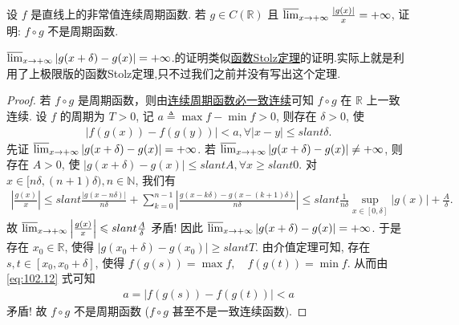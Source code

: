 \documentclass[../../main.tex]{subfiles}
\begin{document}
\begin{example}
设 $f$ 是直线上的非常值连续周期函数. 若 $g \in C(\mathbb{R})$ 且 $\varlimsup_{x \to +\infty} \frac{|g(x)|}{x} = +\infty$, 证明: $f \circ g$ 不是周期函数.
\end{example}
\begin{note}
$\varlimsup_{x \to +\infty} |g(x + \delta) - g(x)| = +\infty$.的证明类似\hyperref[theorem:函数Stolz定理]{函数Stolz定理}的证明.实际上就是利用了上极限版的函数Stolz定理,只不过我们之前并没有写出这个定理.
\end{note}
\begin{proof}
若 $f \circ g$ 是周期函数，则由\hyperref[proposition:连续周期函数必一致连续]{连续周期函数必一致连续}可知 $f \circ g$ 在 $\mathbb{R}$ 上一致连续.
设 $f$ 的周期为 $T > 0$, 记 $a \triangleq \max f - \min f > 0$, 则存在 $\delta > 0$, 使
\begin{align}
|f(g(x)) - f(g(y))| < a, \forall |x - y| \leqslant slant \delta. \label{eq:102.12}
\end{align}
先证 $\varlimsup_{x \to +\infty} |g(x + \delta) - g(x)| = +\infty$. 若 $\varlimsup_{x \to +\infty} |g(x + \delta) - g(x)| \ne +\infty$, 则存在 $A > 0$, 使
$|g(x + \delta) - g(x)| \leqslant slant A, \forall x \geqslant slant 0.$
对 $x \in [n\delta, (n + 1)\delta), n \in \mathbb{N}$, 我们有
\begin{align*}
\left| \frac{g(x)}{x} \right| \leqslant slant \frac{|g(x - n\delta)|}{n\delta} + \sum_{k=0}^{n - 1} \left| \frac{g(x - k\delta) - g(x - (k + 1)\delta)}{n\delta} \right| \leqslant slant \frac{1}{n\delta} \sup_{x \in [0, \delta]} |g(x)| + \frac{A}{\delta}.
\end{align*}
故 $\varlimsup_{x \to +\infty} \left| \frac{g(x)}{x} \right| \leqslant slant \frac{A}{\delta}$ 矛盾! 因此 $\varlimsup_{x \to +\infty} |g(x + \delta) - g(x)| = +\infty$.
于是存在 $x_0 \in \mathbb{R}$, 使得 $|g(x_0 + \delta) - g(x_0)| \geqslant slant T$. 由介值定理可知, 存在 $s, t \in [x_0, x_0 + \delta]$, 使得
$f(g(s)) = \max f, \quad f(g(t)) = \min f.$
从而由 \eqref{eq:102.12} 式可知
\begin{align*}
a = |f(g(s)) - f(g(t))| < a
\end{align*}
矛盾! 故 $f \circ g$ 不是周期函数 ($f \circ g$ 甚至不是一致连续函数).
\end{proof}
\end{document}
